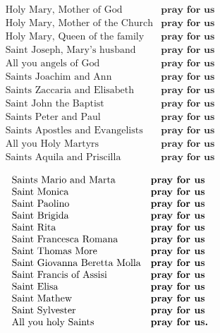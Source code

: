 \[\begin{array}{ll}
\textrm{Holy Mary, Mother of God} & \textbf{pray for us}\\
\textrm{Holy Mary, Mother of the Church} & \textbf{pray for us}\\
\textrm{Holy Mary, Queen of the family} & \textbf{pray for us}\\
\textrm{Saint Joseph, Mary's husband} & \textbf{pray for us}\\
\textrm{All you angels of God} & \textbf{pray for us}\\
\textrm{Saints Joachim and Ann} & \textbf{pray for us}\\
\textrm{Saints Zaccaria and Elisabeth} & \textbf{pray for us}\\
\textrm{Saint John the Baptist} & \textbf{pray for us}\\
\textrm{Saints Peter and Paul} & \textbf{pray for us}\\
\textrm{Saints Apostles and Evangelists} & \textbf{pray for us}\\
\textrm{All you Holy Martyrs} & \textbf{pray for us}\\
\textrm{Saints Aquila and Priscilla} & \textbf{pray for us}\\
\end{array}\]
\[\begin{array}{ll}
\textrm{Saints Mario and Marta} & \textbf{pray for us}\\
\textrm{Saint Monica} & \textbf{pray for us}\\
\textrm{Saint Paolino} & \textbf{pray for us}\\
\textrm{Saint Brigida} & \textbf{pray for us}\\
\textrm{Saint Rita} & \textbf{pray for us}\\
\textrm{Saint Francesca Romana} & \textbf{pray for us}\\
\textrm{Saint Thomas More} & \textbf{pray for us}\\
\textrm{Saint Giovanna Beretta Molla} & \textbf{pray for us}\\
\textrm{Saint Francis of Assisi} & \textbf{pray for us}\\
\textrm{Saint Elisa} & \textbf{pray for us}\\
\textrm{Saint Mathew} & \textbf{pray for us}\\
\textrm{Saint Sylvester} & \textbf{pray for us}\\
\textrm{All you holy Saints} & \textbf{pray for us.}\\
\end{array}\]


